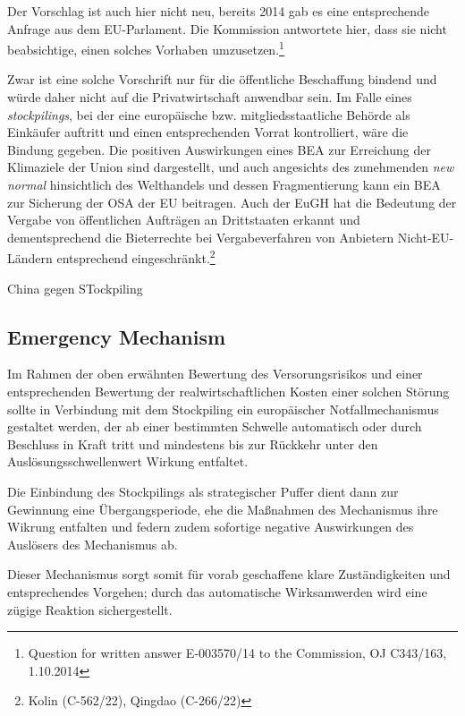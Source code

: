 \documentclass[12pt,a4paper,oneside]{book} %
\begin{document}
Der Vorschlag ist auch hier nicht neu, bereits 2014 gab es eine entsprechende Anfrage aus dem EU-Parlament. Die Kommission antwortete hier, dass sie nicht beabsichtige, einen solches Vorhaben umzusetzen.\footnote{Question for written answer E-003570/14 to the Commission, OJ C343/163, 1.10.2014}

Zwar ist eine solche Vorschrift nur für die öffentliche Beschaffung bindend und würde daher nicht auf die Privatwirtschaft anwendbar sein. Im Falle eines \textit{stockpilings}, bei der eine europäische bzw. mitgliedsstaatliche Behörde als Einkäufer auftritt und einen entsprechenden Vorrat kontrolliert, wäre die Bindung gegeben.
Die positiven Auswirkungen eines BEA zur Erreichung der Klimaziele der Union sind dargestellt,\autocite{https://www.carbone4.com/en/publication-buy-european-and-sustainable-act} und auch angesichts des zunehmenden \textit{new normal} hinsichtlich des Welthandels und dessen Fragmentierung kann ein BEA zur Sicherung der OSA der EU beitragen.\autocite{https://insightplus.bakermckenzie.com/bm/international-commercial-trade/european-union-buy-european-gets-teeth}
Auch der EuGH hat die Bedeutung der Vergabe von öffentlichen Aufträgen an Drittstaaten erkannt und dementsprechend die Bieterrechte bei Vergabeverfahren von Anbietern Nicht-EU-Ländern entsprechend eingeschränkt.\footnote{Kolin (C-562/22), Qingdao (C-266/22)}

China gegen STockpiling

\subsection{Emergency Mechanism}
Im Rahmen der oben erwähnten Bewertung des Versorungsrisikos und einer entsprechenden Bewertung der realwirtschaftlichen Kosten einer solchen Störung sollte in Verbindung mit dem Stockpiling ein europäischer Notfallmechanismus gestaltet werden, der ab einer bestimmten Schwelle automatisch oder durch Beschluss in Kraft tritt und mindestens bis zur Rückkehr unter den Auslösungsschwellenwert Wirkung entfaltet. 

Die Einbindung des Stockpilings als strategischer Puffer dient dann zur Gewinnung eine Übergangsperiode, ehe die Maßnahmen des Mechanismus ihre Wikrung entfalten und federn zudem sofortige negative Auswirkungen des Auslösers des Mechanismus ab.

Dieser Mechanismus sorgt somit für vorab geschaffene klare Zuständigkeiten und entsprechendes Vorgehen; durch das automatische Wirksamwerden wird eine zügige Reaktion sichergestellt. 
\end{document}
